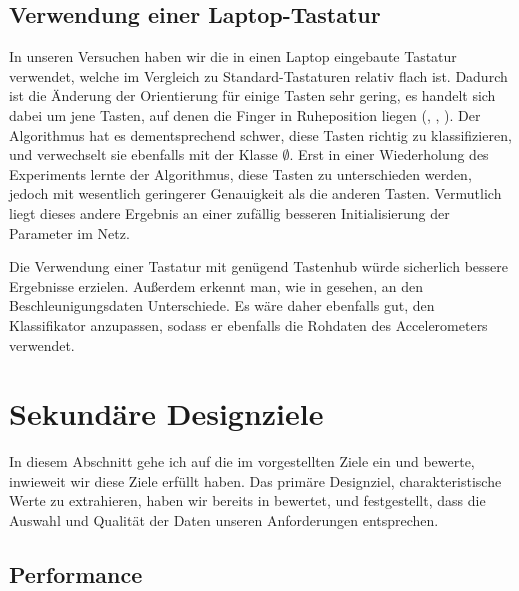 \subsection{Verwendung einer Laptop-Tastatur}

In unseren Versuchen haben wir die in einen Laptop eingebaute Tastatur
verwendet, welche im Vergleich zu Standard-Tastaturen relativ flach ist.
Dadurch ist die Änderung der Orientierung für einige Tasten sehr gering, es
handelt sich dabei um jene Tasten, auf denen die Finger in Ruheposition liegen
(, , \keyboard{\spacebar}). Der Algorithmus hat es
dementsprechend schwer, diese Tasten richtig zu klassifizieren, und verwechselt
sie ebenfalls mit der Klasse $\emptyset$. Erst in einer Wiederholung des
Experiments lernte der Algorithmus, diese Tasten zu unterschieden werden,
jedoch mit wesentlich geringerer Genauigkeit als die anderen Tasten. Vermutlich
liegt dieses andere Ergebnis an einer zufällig besseren Initialisierung der
Parameter im Netz.

Die Verwendung einer Tastatur mit genügend Tastenhub würde sicherlich
bessere Ergebnisse erzielen. Außerdem erkennt man, wie in
 gesehen, an den Beschleunigungsdaten Unterschiede. Es
wäre daher ebenfalls gut, den Klassifikator anzupassen, sodass er ebenfalls
die Rohdaten des Accelerometers verwendet.

\section{Sekundäre Designziele}

In diesem Abschnitt gehe ich auf die im  vorgestellten Ziele ein
und bewerte, inwieweit wir diese Ziele erfüllt haben. Das primäre Designziel,
charakteristische Werte zu extrahieren, haben wir bereits in
 bewertet, und festgestellt, dass die Auswahl und
Qualität der Daten unseren Anforderungen entsprechen.

\subsection{Performance}

